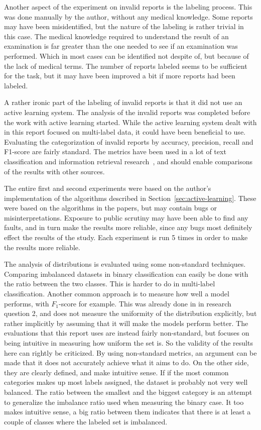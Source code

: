 Another aspect of the experiment on invalid reports is the labeling process.
This was done manually by the author, without any medical knowledge.
Some reports may have been misidentified, but the nature of the labeling is rather trivial in this case.
The medical knowledge required to understand the result of an examination is far greater than the one needed to see if an examination was performed.
Which in most cases can be identified not despite of, but because of the lack of medical terms.
The number of reports labeled seems to be sufficient for the task, but it may have been improved a bit if more reports had been labeled.

A rather ironic part of the labeling of invalid reports is that it did not use an active learning system.
The analysis of the invalid reports was completed before the work with active learning started.
While the active learning system dealt with in this report focused on multi-label data, it could have been beneficial to use.
Evaluating the categorization of invalid reports by accuracy, precision, recall and F1-score are fairly standard.
The metrics have been used in a lot of text classification and information retrieval research~\cite{aggarwal2012surveyclass, bishop2006pattern}, and should enable comparisons of the results with other sources.

The entire first and second experiments were based on the author's implementation of the algorithms described in Section~\ref{sec:active-learning}.
These were based on the algorithms in the papers, but may contain bugs or misinterpretations.
Exposure to public scrutiny may have been able to find any faults, and in turn make the results more reliable, since any bugs most definitely effect the results of the study.
Each experiment is run 5 times in order to make the results more reliable.

The analysis of distributions is evaluated using some non-standard techniques.
Comparing imbalanced datasets in binary classification can easily be done with the ratio between the two classes.
This is harder to do in multi-label classification. 
Another common approach is to measure how well a model performs, with $F_1$-score for example.
This was already done in in research question 2, and does not measure the uniformity of the distribution explicitly, but rather implicitly by assuming that it will make the models perform better.
The evaluations that this report uses are instead fairly non-standard, but focuses on being intuitive in measuring how uniform the set is.
So the validity of the results here can rightly be criticized.
By using non-standard metrics, an argument can be made that it does not accurately achieve what it aims to do.
On the other side, they are clearly defined, and make intuitive sense.
If if the most common categories makes up most labels assigned, the dataset is probably not very well balanced.
The ratio between the smallest and the biggest category is an attempt to generalize the imbalance ratio used when measuring the binary case.
It too makes intuitive sense, a big ratio between them indicates that there is at least a couple of classes where the labeled set is imbalanced.

